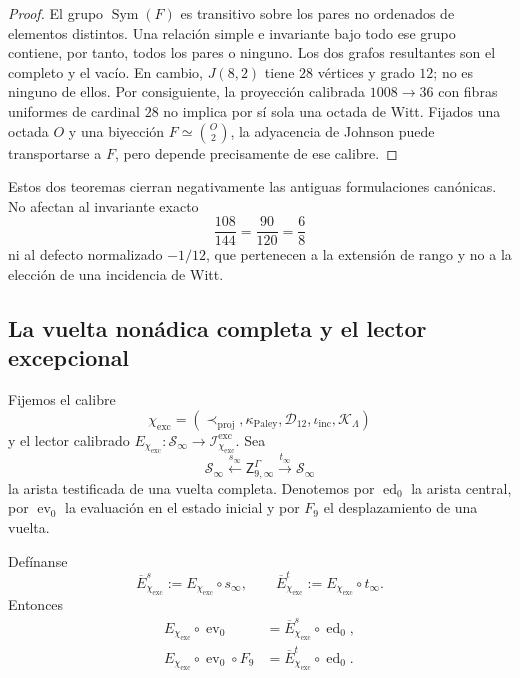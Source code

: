 \begin{proof}
El grupo \(\operatorname{Sym}(F)\) es transitivo sobre los pares no ordenados
de elementos distintos. Una relación simple e invariante bajo todo ese grupo
contiene, por tanto, todos los pares o ninguno. Los dos grafos resultantes son
el completo y el vacío. En cambio, \(J(8,2)\) tiene \(28\) vértices y
grado \(12\); no es ninguno de ellos. Por consiguiente, la proyección
calibrada \(1008\to36\) con fibras uniformes de cardinal \(28\) no implica
por sí sola una octada de Witt. Fijados una octada \(O\) y una biyección
\(F\simeq\binom{O}{2}\), la adyacencia de Johnson puede transportarse a \(F\),
pero depende precisamente de ese calibre.
\end{proof}

Estos dos teoremas cierran negativamente las antiguas formulaciones
canónicas. No afectan al invariante exacto
\[
 \frac{108}{144}=\frac{90}{120}=\frac68
\]
ni al defecto normalizado \(-1/12\), que pertenecen a la extensión de rango
y no a la elección de una incidencia de Witt.

\subsection{La vuelta nonádica completa y el lector excepcional}

Fijemos el calibre
\[
 \chi_{\mathrm{exc}}
 =(
 \prec_{\mathrm{proj}},
 \kappa_{\mathrm{Paley}},
 \mathcal D_{12},
 \iota_{\mathrm{inc}},
 \mathcal K_{\Lambda})
\]
y el lector calibrado
\(E_{\chi_{\mathrm{exc}}}:\mathscr S_\infty
\to\mathcal I^{\mathrm{exc}}_{\chi_{\mathrm{exc}}}\).
Sea
\[
 \mathscr S_\infty\xleftarrow{s_\infty}
 \mathsf Z^{\Gamma}_{9,\infty}
 \xrightarrow{t_\infty}\mathscr S_\infty
\]
la arista testificada de una vuelta completa. Denotemos por
\(\operatorname{ed}_0\) la arista central, por \(\operatorname{ev}_0\) la
evaluación en el estado inicial y por \(F_9\) el desplazamiento de una vuelta.

\begin{theorem}
\label{thm:hmt-final-factorizacion-gamma-nueve}
Defínanse
\[
 \overline E^{s}_{\chi_{\mathrm{exc}}}
 :=E_{\chi_{\mathrm{exc}}}\circ s_\infty,
 \qquad
 \overline E^{t}_{\chi_{\mathrm{exc}}}
 :=E_{\chi_{\mathrm{exc}}}\circ t_\infty.
\]
Entonces
\begin{align}
 E_{\chi_{\mathrm{exc}}}\circ\operatorname{ev}_0
 &=\overline E^{s}_{\chi_{\mathrm{exc}}}
   \circ\operatorname{ed}_0,
 \label{eq:hmt-final-factorizacion-gamma-fuente}\\
 E_{\chi_{\mathrm{exc}}}\circ\operatorname{ev}_0\circ F_9
 &=\overline E^{t}_{\chi_{\mathrm{exc}}}
   \circ\operatorname{ed}_0.
 \label{eq:hmt-final-factorizacion-gamma-destino}
\end{align}
\end{theorem}

